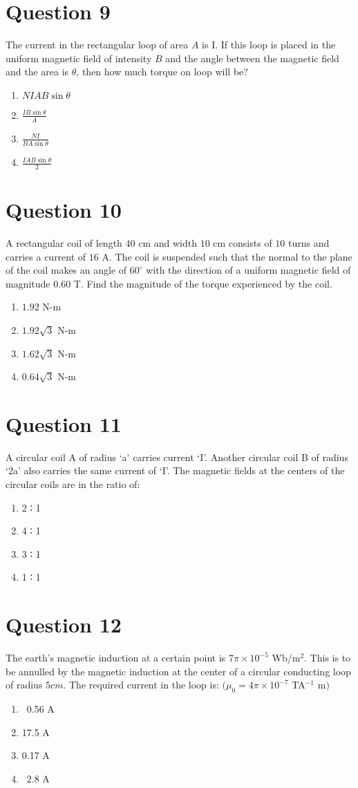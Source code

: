 \documentclass{article}
\begin{document}
\section*{Question 9}
The current in the rectangular loop of area \(A\) is I. If this loop is placed in the uniform magnetic field of intensity \(B\) and the angle between the magnetic field and the area is \(\theta\), then how much torque on loop will be?
\begin{enumerate}[label=(\alph*)]
\item \(NIAB \sin \theta\)
\item \(\frac{IB \sin \theta}{A}\)
\item \(\frac{NI}{B A \sin \theta}\)
\item \(\frac{I A B \sin \theta}{2}\)
\end{enumerate}
\newpage
\section*{Question 10}
A rectangular coil of length \(40\) cm and width \(10\) cm consists of \(10\) turns and carries a current of \(16\) A. The coil is suspended such that the normal to the plane of the coil makes an angle of \(60^{\circ}\) with the direction of a uniform magnetic field of magnitude \(0.60\) T. Find the magnitude of the torque experienced by the coil.
\begin{enumerate}[label=(\alph*)]
\item \(1.92\) N-m
\item \(1.92 \sqrt{3}\) N-m
\item \(1.62 \sqrt{3}\) N-m
\item \(0.64 \sqrt{3}\) N-m
\end{enumerate}
\newpage
\section*{Question 11}
A circular coil A of radius ‘a’ carries current ‘I’. Another circular coil B of radius ‘2a’ also carries the same current of ‘I’. The magnetic fields at the centers of the circular coils are in the ratio of:
\begin{enumerate}[label=(\alph*)]
\item 2 ∶ 1
\item 4 ∶ 1
\item 3 ∶ 1
\item 1 ∶ 1
\end{enumerate}
\newpage
\section*{Question 12}
The earth's magnetic induction at a certain point is \(7 \pi \times 10^{-5}\) Wb/m\(^{2}\). This is to be annulled by the magnetic induction at the center of a circular conducting loop of radius \(5 cm\). The required current in the loop is: \((\mu_{0}=4 \pi \times 10^{-7}\) TA\(^{-1}\) m\()\)
\begin{enumerate}[label=(\alph*)]
\item  0.56 A
\item 17.5 A
\item 0.17 A
\item  2.8 A
\end{enumerate}
\newpage
\end{document}
